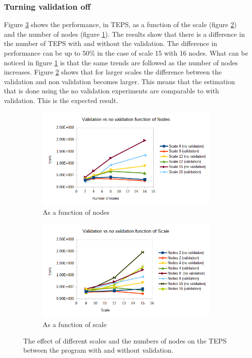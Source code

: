 \subsubsection{Turning validation off}
\label{sec:noval}
 Figure \ref{fig:val_vs_noval} shows the performance, in TEPS, as a function of the scale (figure \ref{fig:scale_val_noval}) and the number of nodes (figure \ref{fig:nodes_val_noval}). The results show that there is a difference in the number of TEPS with and without the validation. The difference in performance can be up to 50\% in the case of scale 15 with 16 nodes. What can be noticed in figure \ref{fig:nodes_val_noval} is that the same trends are followed as the number of nodes increases.
 Figure \ref{fig:scale_val_noval} shows that for larger scales the difference between the validation and non validation becomes larger. This means that the estimation that is done using the no validation experiments are comparable to with validation. This is the expected result. 
\begin{figure}[!h]
\centering
\begin{subfigure}{.5\textwidth}
  \centering
  \includegraphics[width=\linewidth]{images/nodes_scale_vs_noscale.png}
  \caption{As a function of nodes}
  \label{fig:nodes_val_noval}
\end{subfigure}%
\begin{subfigure}{.5\textwidth}
  \centering
  \includegraphics[width=\linewidth]{images/scale_val_vs_noval.png}
  \caption{As a function of scale}
  \label{fig:scale_val_noval}
\end{subfigure}
\caption{The effect of different scales and the numbers of nodes on the TEPS between the program with and without validation.}
\label{fig:val_vs_noval}
\end{figure}

